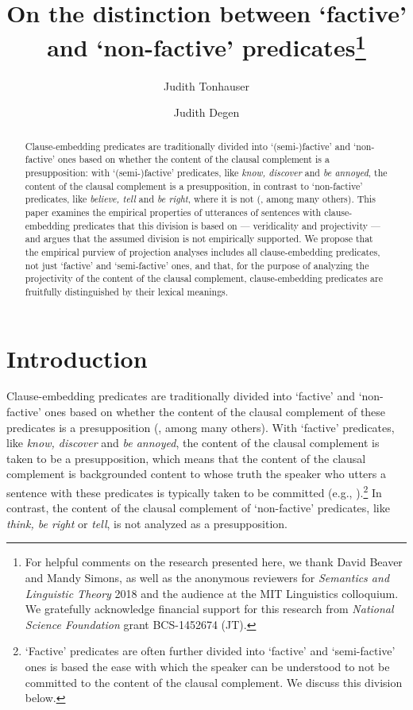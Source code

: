\documentclass[11pt,fleqn]{article}
\title{On the distinction between `factive' and `non-factive' predicates\thanks{For helpful comments on the research presented here, we thank David Beaver and Mandy Simons, as well as the anonymous reviewers for {\em Semantics and Linguistic Theory} 2018 and the audience at the MIT Linguistics colloquium. We gratefully acknowledge financial support for this research from {\em National Science Foundation} grant BCS-1452674 (JT).}}
\author[$\circ$]{Judith Tonhauser}
\author[$\bullet$]{Judith Degen}
\affil[$\circ$]{The Ohio State University}
\affil[$\bullet$]{Stanford University}
\newcommand{\6}{\mbox{$[\hspace*{-.6mm}[$}}
\newcommand{\9}{\mbox{$]\hspace*{-.6mm}]$}}
\begin{document}

\maketitle


\begin{abstract}

Clause-embedding predicates are traditionally divided into `(semi-)factive' and `non-factive' ones based on whether the content of the clausal complement is a presupposition: with `(semi-)factive' predicates, like {\em know, discover} and {\em be annoyed}, the content of the clausal complement is a presupposition, in contrast to `non-factive' predicates, like {\em believe, tell} and {\em be right}, where it is not  (\citealt{kiparsky-kiparsky71,karttunen71b,vds92,beaver-geurts-sep}, among many others). This paper examines the empirical properties of utterances of sentences with clause-embedding predicates that this division is based on --- veridicality and projectivity --- and argues that the assumed division is not empirically supported. We propose that the empirical purview of projection analyses includes all clause-embedding predicates, not just `factive' and `semi-factive' ones, and that, for the purpose of analyzing the projectivity of the content of the clausal complement, clause-embedding predicates are  fruitfully distinguished by their lexical meanings.

\end{abstract}
			
\section{Introduction}\label{s1}

Clause-embedding predicates are traditionally divided into `factive' and `non-factive'  ones based on whether the content of the clausal complement of these predicates is a presupposition (\citealt{kiparsky-kiparsky71,karttunen71b,vds92,beaver-geurts-sep}, among many others). With `factive' predicates, like {\em know, discover} and {\em be annoyed}, the content of the clausal complement is taken to be a presupposition, which means that the content of the clausal complement is backgrounded content to whose truth the speaker who utters a sentence with these predicates is typically taken to be committed (e.g., \citealt{stalnaker74,ccmg90}).\footnote{`Factive' predicates are often further divided into `factive' and `semi-factive' ones is based the ease with which the speaker can be understood to not be committed to the content of the clausal complement. We discuss this division below.} In contrast, the content of the clausal complement of `non-factive' predicates, like {\em think, be right} or {\em tell}, is not analyzed as a presupposition. 
\end{document}
